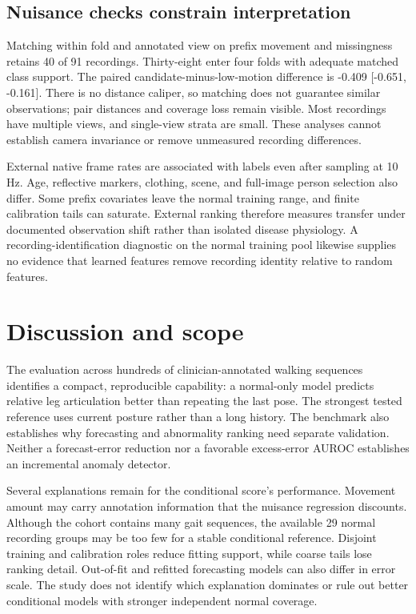 \documentclass[letterpaper]{article}
\begin{document}
\subsection{Nuisance checks constrain interpretation}

Matching within fold and annotated view on prefix movement and missingness retains 40 of 91 recordings. Thirty-eight enter four folds with adequate matched class support. The paired candidate-minus-low-motion difference is -0.409 [-0.651, -0.161]. There is no distance caliper, so matching does not guarantee similar observations; pair distances and coverage loss remain visible. Most recordings have multiple views, and single-view strata are small. These analyses cannot establish camera invariance or remove unmeasured recording differences.

External native frame rates are associated with labels even after sampling at 10 Hz. Age, reflective markers, clothing, scene, and full-image person selection also differ. Some prefix covariates leave the normal training range, and finite calibration tails can saturate. External ranking therefore measures transfer under documented observation shift rather than isolated disease physiology. A recording-identification diagnostic on the normal training pool likewise supplies no evidence that learned features remove recording identity relative to random features.

\section{Discussion and scope}

The evaluation across hundreds of clinician-annotated walking sequences identifies a compact, reproducible capability: a normal-only model predicts relative leg articulation better than repeating the last pose. The strongest tested reference uses current posture rather than a long history. The benchmark also establishes why forecasting and abnormality ranking need separate validation. Neither a forecast-error reduction nor a favorable excess-error AUROC establishes an incremental anomaly detector.

Several explanations remain for the conditional score's performance. Movement amount may carry annotation information that the nuisance regression discounts. Although the cohort contains many gait sequences, the available 29 normal recording groups may be too few for a stable conditional reference. Disjoint training and calibration roles reduce fitting support, while coarse tails lose ranking detail. Out-of-fit and refitted forecasting models can also differ in error scale. The study does not identify which explanation dominates or rule out better conditional models with stronger independent normal coverage.
\end{document}
